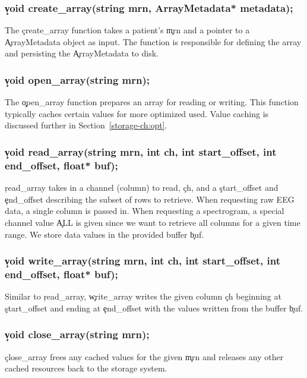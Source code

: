 \subsubsection{\c{void create\_array(string mrn, ArrayMetadata* metadata);}}

The \c{create\_array} function takes a patient's \c{mrn} and a pointer to a
\c{ArrayMetadata} object as input. The function is responsible for defining the
array and persisting the \c{ArrayMetadata} to disk.

\subsubsection{\c{void open\_array(string mrn);}}

The \c{open\_array} function prepares an array for reading or writing. This
function typically caches certain values for more optimized used. Value caching is
discussed further in Section~\ref{storage-ch:opt}.

\subsubsection{\c{void read\_array(string mrn, int ch, int start\_offset, int end\_offset, float* buf);}}

\c{read\_array} takes in a channel (column) to read, \c{ch}, and a
\c{start\_offset} and \c{end\_offset} describing the subset of rows to
retrieve. When requesting raw EEG data, a single column is passed in. When
requesting a spectrogram, a special channel value \c{ALL} is given since we
want to retrieve all columns for a given time range. We store data values in
the provided buffer \c{buf}.

\subsubsection{\c{void write\_array(string mrn, int ch, int start\_offset, int end\_offset, float* buf);}}

Similar to \c{read\_array}, \c{write\_array} writes the given column \c{ch}
beginning at \c{start\_offset} and ending at \c{end\_offset} with the values
written from the buffer \c{buf}.

\subsubsection{\c{void close\_array(string mrn);}}

\c{close\_array} frees any cached values for the given \c{mrn} and releases any
other cached resources back to the storage system.

